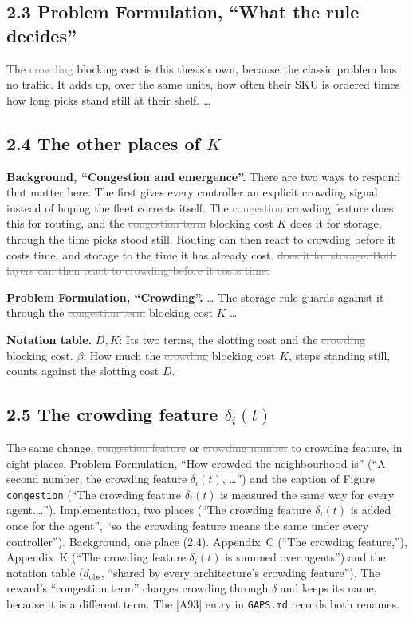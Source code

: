 \documentclass[11pt,a4paper]{article}
\newcommand{\new}[1]{\textcolor{newc}{#1}}
\newcommand{\old}[1]{\textcolor{gray}{\sout{#1}}}
\begin{document}
\subsection*{2.3 Problem Formulation, ``What the rule decides''}
The \old{crowding} \new{blocking} cost is this thesis's own, because the classic
problem has no traffic. It adds up, over the same units, how often their SKU is
ordered times how long picks stand still at their shelf. \ldots

\subsection*{2.4 The other places of $K$}
\textbf{Background, ``Congestion and emergence''.} There are two ways to respond
that matter here. The first gives every controller an explicit crowding signal
instead of hoping the fleet corrects itself. The \old{congestion}
\new{crowding} feature does this for routing, and the \old{congestion term}
\new{blocking cost} $K$ \new{does it for storage, through the time picks stood
still. Routing can then react to crowding before it costs time, and storage to
the time it has already cost.} \old{does it for storage. Both layers can then
react to crowding before it costs time.}

\textbf{Problem Formulation, ``Crowding''.} \ldots{} The storage rule guards
against it through the \old{congestion term} \new{blocking cost} $K$ \ldots

\textbf{Notation table.} $D, K$: Its two terms, the slotting cost and the
\old{crowding} \new{blocking} cost. $\beta$: How much the \old{crowding}
\new{blocking} cost $K$, steps standing still, counts against the slotting
cost $D$.

\subsection*{2.5 The crowding feature $\delta_i(t)$}
The same change, \old{congestion feature} or \old{crowding number} to
\new{crowding feature}, in eight places. Problem Formulation, ``How crowded the
neighbourhood is'' (``A second number, the \new{crowding feature}
$\delta_i(t)$, \ldots'') and the caption of Figure \texttt{congestion} (``The
\new{crowding feature} $\delta_i(t)$ is measured the same way for every
agent.\ldots''). Implementation, two places (``The \new{crowding feature}
$\delta_i(t)$ is added once for the agent'', ``so the \new{crowding feature}
means the same under every controller''). Background, one place (2.4). Appendix~C
(``The \new{crowding feature},''), Appendix~K (``The \new{crowding feature}
$\delta_i(t)$ is summed over agents'') and the notation table ($d_{\mathrm{obs}}$,
``shared by every architecture's \new{crowding feature}''). The reward's
``congestion term'' charges crowding through $\delta$ and keeps its name, because
it is a different term. The [A93] entry in \texttt{GAPS.md} records both renames.
\end{document}
